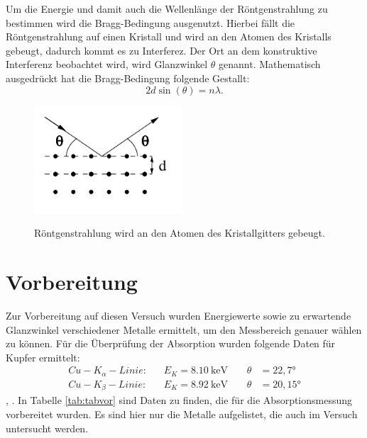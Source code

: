Um die Energie und damit auch die Wellenlänge der Röntgenstrahlung zu bestimmen wird die
Bragg-Bedingung ausgenutzt. Hierbei fällt die Röntgenstrahlung auf einen Kristall und wird an den
Atomen des Kristalls gebeugt, dadurch kommt es zu Interferez. Der Ort an dem konstruktive
Interferenz beobachtet wird, wird Glanzwinkel $\theta$ genannt.
Mathematisch ausgedrückt hat die Bragg-Bedingung folgende Gestallt:
\begin{equation}
  2d\sin(\theta)=n\lambda.
  \label{eqn:bragg}
\end{equation}

\begin{figure}
  \centering
  \includegraphics[height=4cm]{bragg.png}
  \caption{Röntgenstrahlung wird an den Atomen des Kristallgitters gebeugt.}
  \label{fig:bragg}
  \cite{skript}
\end{figure}



\section{Vorbereitung}

Zur Vorbereitung auf diesen Versuch wurden Energiewerte sowie zu erwartende Glanzwinkel verschiedener
Metalle ermittelt, um den Messbereich genauer wählen zu können.
Für die Überprüfung der Absorption wurden folgende Daten für Kupfer ermittelt:
\begin{align*}
  Cu-K_{\alpha}-Linie:& \;\;\;E_K=\SI{8,10}{\keV}\;\;\;\;&\theta &=22,7°\\
  Cu-K_{\beta}-Linie:& \;\;\;E_K=\SI{8,92}{\keV}\;\;\;\;&\theta &=20,15°
\end{align*}
\cite{leifi}, \cite{kbeta}.
In Tabelle \ref{tab:tabvor} sind Daten zu finden, die für die Absorptionsmessung
vorbereitet wurden. Es sind hier nur die Metalle aufgelistet, die auch im Versuch
untersucht werden.

